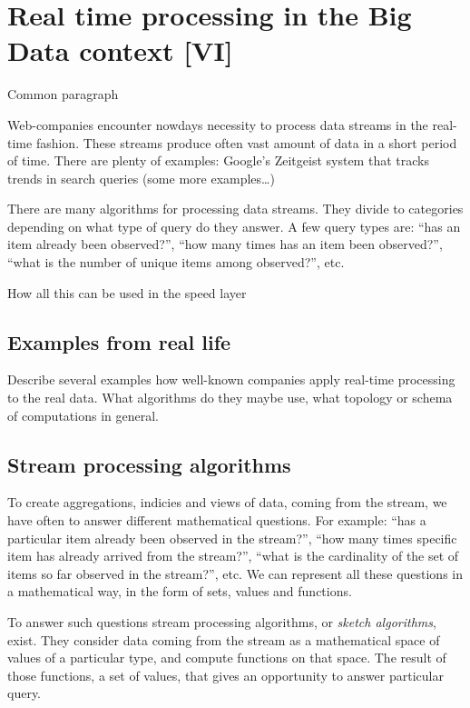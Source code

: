 \chapter{Real time processing in the Big Data context [VI]}
\label{chap:real_time_processing}

Common paragraph

Web-companies encounter nowdays necessity to process data streams in the real-time fashion.
These streams produce often vast amount of data in a short period of time.
There are plenty of examples: Google's Zeitgeist system that tracks trends in search queries (some more examples\ldots)

There are many algorithms for processing data streams.
They divide to categories depending on what type of query do they answer.
A few query types are: ``has an item already been observed?'', ``how many times has an item been observed?'', ``what is the number of unique items among observed?'', etc.

How all this can be used in the speed layer

\section{Examples from real life}

Describe several examples how well-known companies apply real-time processing to the real data.
What algorithms do they maybe use, what topology or schema of computations in general.

\section{Stream processing algorithms}

To create aggregations, indicies and views of data, coming from the stream, we have often to answer different mathematical questions.
For example: ``has a particular item already been observed in the stream?'', ``how many times specific item has already arrived from the stream?'', ``what is the cardinality of the set of items so far observed in the stream?'', etc.
We can represent all these questions in a mathematical way, in the form of sets, values and functions.

To answer such questions stream processing algorithms, or \textit{sketch algorithms}, exist.
They consider data coming from the stream as a mathematical space of values of a particular type, and compute functions on that space.
The result of those functions, a set of values, that gives an opportunity to answer particular query.

